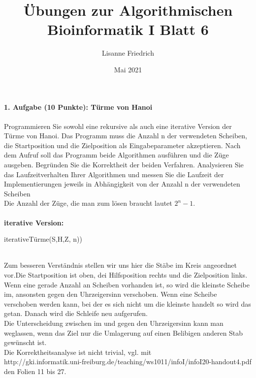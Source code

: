 \documentclass{article}
\title{Übungen zur Algorithmischen Bioinformatik I
Blatt 6}
\author{Lisanne Friedrich }
\date{Mai 2021}
\begin{document}
\maketitle
\textbf{1. Aufgabe (10 Punkte): Türme von Hanoi}\\ \\
Programmieren Sie sowohl eine rekursive als auch eine iterative Version der Türme von Hanoi. Das Programm muss die Anzahl n der verwendeten Scheiben, die Startposition und die Zielposition als Eingabeparameter akzeptieren. Nach dem Aufruf soll das Programm beide Algorithmen ausführen und die Züge ausgeben. Begründen Sie die Korrektheit der beiden Verfahren. Analysieren Sie das Laufzeitverhalten Ihrer Algorithmen und messen Sie die Laufzeit der Implementierungen jeweils in Abhängigkeit von der Anzahl n der verwendeten Scheiben\\ 
Die Anzahl der Züge, die man zum lösen braucht lautet $2^n -1 $. \\\\
 \textbf{iterative Version:}
 \begin{algorithm}
    \NoCaptionOfAlgo
    \caption{iterativeTürme(S,H,Z, n))}
\end{algorithm}\\
Zum besseren Verständnis stellen wir uns hier die Stäbe im Kreis angeordnet vor.Die Startposition ist oben, dei Hilfsposition rechts und die Zielposition links.\\
Wenn eine gerade Anzahl an Scheiben vorhanden ist, so wird die kleinste Scheibe im, ansonsten gegen den Uhrzeigersinn verschoben. Wenn eine Scheibe verschoben werden kann, bei der es sich nicht um die kleinste handelt so wird das getan. Danach wird die Schleife neu aufgerufen.\\
Die Unterscheidung zwischen im und gegen den Uhrzeigersinn kann man weglassen, wenn das Ziel nur die Umlagerung auf einen Belibigen anderen Stab gewünscht ist.\\
Die Korrektheitsanalyse ist nicht trivial, vgl. mit\\ http://gki.informatik.uni-freiburg.de/teaching/ws1011/infoI/infoI20-handout4.pdf den Folien 11 bis 27.\\
\end{document}
